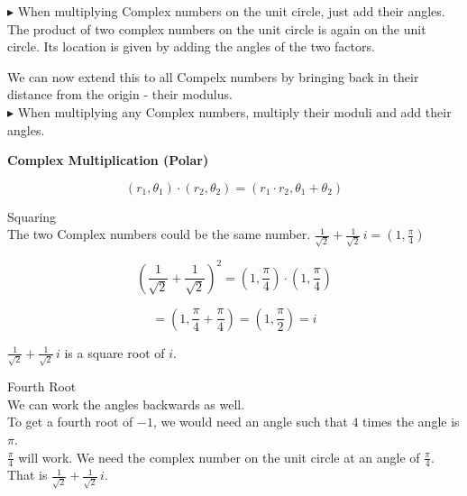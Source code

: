 \documentclass{ximera}
\begin{document}
 

\textcolor{red!80!black}{$\blacktriangleright$} When multiplying Complex numbers on the unit circle, just add their angles. \\




The product of two complex numbers on the unit circle is again on the unit circle. Its location is given by adding the angles of the two factors.


We can now extend this to all Compelx numbers by bringing back in their distance from the origin - their modulus. \\




\textcolor{red!80!black}{$\blacktriangleright$} When multiplying any Complex numbers, multiply their moduli and add their angles.



\begin{theorem}  \textbf{\textcolor{green!50!black}{Complex Multiplication (Polar)}}

\[  (r_1, \theta_1) \cdot (r_2, \theta_2) = (r_1 \cdot r_2, \theta_1 + \theta_2)              \]


\end{theorem}




\begin{example}  Squaring \\


The two Complex numbers could be the same number. $\frac{1}{\sqrt{2}} + \frac{1}{\sqrt{2}} \, i = \left(1, \frac{\pi}{4} \right)$


\[
\left( \frac{1}{\sqrt{2}} + \frac{1}{\sqrt{2}} \right)^2 = \left(1, \frac{\pi}{4} \right) \cdot \left(1, \frac{\pi}{4} \right)
\]

\[
= \left(1, \frac{\pi}{4} + \frac{\pi}{4} \right) = (1, \frac{\pi}{2}) = i
\]




$\frac{1}{\sqrt{2}} + \frac{1}{\sqrt{2}} \, i$ is a square root of $i$.


\end{example}







\begin{example}  Fourth Root \\


We can work the angles backwards as well.  \\

To get a fourth root of $-1$, we would need an angle such that $4$ times the angle is $\pi$.    \\

$\frac{\pi}{4}$ will work.  We need the complex number on the unit circle at an angle of $\frac{\pi}{4}$.  That is $\frac{1}{\sqrt{2}} + \frac{1}{\sqrt{2}} \, i$.


\end{example}
\end{document}
